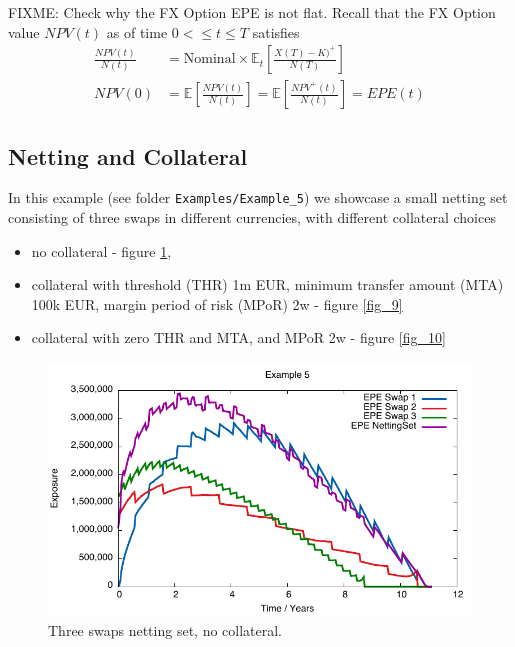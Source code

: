 \documentclass[12pt, a4paper]{article}
\newcommand\E{\ensuremath{\mathbb{E}}}
\newcommand{\EPE}{\mathit{EPE}}
\begin{document}
{\color{red}FIXME: Check why the FX Option EPE is not flat}. Recall that the FX Option value $NPV(t)$ as of time $0 < \leq t \leq T$ satisfies
\begin{align*}
\frac{NPV(t)}{N(t)} &= \mbox{Nominal}\times\E_t\left[\frac{X(T) - K)^+}{N(T)}\right]\\
NPV(0) &= \E\left[\frac{NPV(t)}{N(t)}\right] = \E\left[\frac{NPV^+(t)}{N(t)} \right]= \EPE(t) 
\end{align*}

\subsection{Netting and Collateral}

In this example (see folder {\tt Examples/Example\_5}) we showcase a small netting set consisting of three swaps in different currencies, with different collateral choices
\begin{itemize}
\item no collateral - figure \ref{fig_8},
\item collateral with threshold (THR) 1m EUR, minimum transfer amount (MTA) 100k EUR, margin period of risk (MPoR) 2w - figure \ref{fig_9}
\item collateral with zero THR and MTA, and MPoR 2w - figure \ref{fig_10}
\end{itemize}
 
\begin{figure}[hbt]
\begin{center}
\includegraphics[scale=1.0]{example_nocollateral_epe.pdf}
\end{center}
\caption{Three swaps netting set, no collateral.}
\label{fig_8}
\end{figure}
\end{document}
